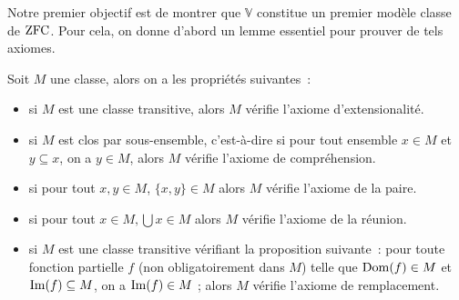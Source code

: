 Notre premier objectif est de montrer que $\mathbb V$ constitue un premier
modèle classe de $\operatorname{ZFC}$. Pour cela, on donne d'abord un lemme essentiel pour
prouver de tels axiomes.

\begin{lemma}\label{lem.axZFC}
  Soit $M$ une classe, alors on a les propriétés suivantes~:
  \begin{itemize}
  \item si $M$ est une classe transitive, alors $M$ vérifie l'axiome
    d'extensionalité.
  \item si $M$ est clos par sous-ensemble, c'est-à-dire si pour tout ensemble
    $x \in M$ et $y \subseteq x$, on a $y \in M$, alors $M$ vérifie l'axiome
    de compréhension.
  \item si pour tout $x,y \in M$, $\{x,y\} \in M$ alors $M$ vérifie l'axiome de
    la paire.
  \item si pour tout $x \in M, \bigcup x \in M$ alors $M$ vérifie l'axiome de la
    réunion.
  \item si $M$ est une classe transitive vérifiant la proposition suivante~:
    pour toute fonction partielle $f$ (non obligatoirement dans $M$) telle que
    $\operatorname{Dom}(f) \in M$ et $\operatorname{Im}(f) \subseteq M$, on a $\operatorname{Im}(f) \in M$ ; alors $M$
    vérifie l'axiome de remplacement.
  \end{itemize}
\end{lemma}

